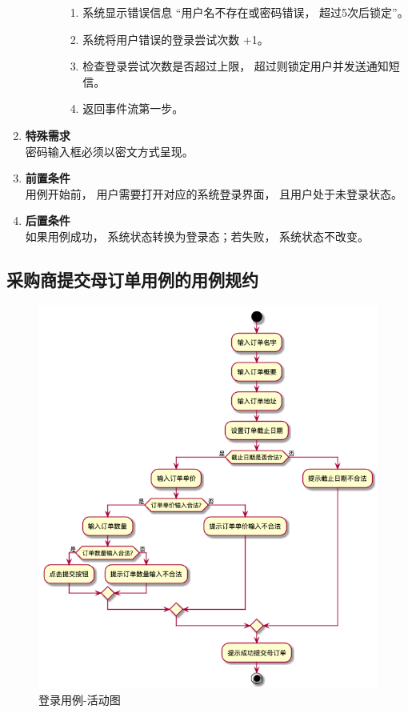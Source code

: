 \begin{enumerate}
\begin{enumerate}
\begin{enumerate}
            \begin{enumerate}
                \item 系统显示错误信息 “用户名不存在或密码错误， 超过5次后锁定”。
                \item 系统将用户错误的登录尝试次数 +1。
                \item 检查登录尝试次数是否超过上限， 超过则锁定用户并发送通知短信。
                \item 返回事件流第一步。
            \end{enumerate}
        \end{enumerate}
    \end{enumerate}
    \item \textbf{特殊需求} \\ 密码输入框必须以密文方式呈现。
    \item \textbf{前置条件} \\ 用例开始前， 用户需要打开对应的系统登录界面， 且用户处于未登录状态。
    \item \textbf{后置条件} \\ 如果用例成功， 系统状态转换为登录态；若失败， 系统状态不改变。
\end{enumerate}


\subsection{采购商提交母订单用例的用例规约}

\begin{figure}[htp]
        \centering
        \includegraphics[width=12cm]{figure/usecase_v2/fabu.png}
        \caption{登录用例-活动图}
        \label{fig:put-mon-order-uml}
    \end{figure}

